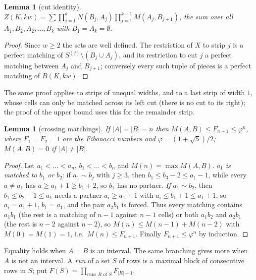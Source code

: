 \documentclass[11pt]{amsart}
\newtheorem{lemma}[theorem]{Lemma}
\theoremstyle{definition}
\theoremstyle{remark}
\begin{document}
\begin{lemma}[cut identity]\label{lem:cut}
$Z(K, kw) = \sum \prod_{j=1}^{k} N(B_j, A_j) \prod_{j=1}^{k-1} M(A_j, B_{j+1})$, the sum over all
$A_1, B_2, A_2, \dots, B_k$ with $B_1 = A_k = \emptyset$.
\end{lemma}
\begin{proof}
Since $w \ge 2$ the sets are well defined. The restriction of $X$ to strip $j$ is a perfect matching
of $S^{(j)} \setminus (B_j \cup A_j)$, and its restriction to cut $j$ a perfect matching between
$A_j$ and $B_{j+1}$; conversely every such tuple of pieces is a perfect matching of $B(K, kw)$.
\end{proof}

The same proof applies to strips of unequal widths, and to a last strip of width $1$, whose cells
can only be matched across its left cut (there is no cut to its right); the proof of the upper
bound uses this for the remainder strip.

\begin{lemma}[crossing matchings]\label{lem:fib}
If $|A| = |B| = n$ then $M(A, B) \le F_{n+1} \le \varphi^n$, where $F_1 = F_2 = 1$ are the
Fibonacci numbers and $\varphi = (1 + \sqrt 5)/2$; $M(A, B) = 0$ if $|A| \ne |B|$.
\end{lemma}
\begin{proof}
Let $a_1 < \dots < a_n$, $b_1 < \dots < b_n$ and $M(n) = \max M(A, B)$. \emph{$a_1$ is matched to
$b_1$ or $b_2$}: if $a_1 \sim b_j$ with $j \ge 3$, then $b_1 \le b_3 - 2 \le a_1 - 1$, while every
$a \ne a_1$ has $a \ge a_1 + 1 \ge b_1 + 2$, so $b_1$ has no partner. \emph{If $a_1 \sim b_2$},
then $b_1 \le b_2 - 1 \le a_1$ needs a partner $a_i \ge a_1 + 1$ with $a_i \le b_1 + 1 \le a_1 + 1$,
so $a_i = a_1 + 1$, $b_1 = a_1$, and the pair $a_2 b_1$ is forced. Thus every matching contains
$a_1 b_1$ (the rest is a matching of $n - 1$ against $n - 1$ cells) or both $a_1 b_2$ and
$a_2 b_1$ (the rest is $n-2$ against $n-2$), so $M(n) \le M(n-1) + M(n-2)$ with
$M(0) = M(1) = 1$, i.e.\ $M(n) \le F_{n+1}$. Finally $F_{n+1} \le \varphi^n$ by induction.
\end{proof}

Equality holds when $A = B$ is an interval. The same branching gives more when $A$ is not an
interval. A \emph{run} of a set $S$ of rows is a maximal block of consecutive rows in $S$; put
$F(S) = \prod_{\text{runs } R \text{ of } S} F_{|R|+1}$.
\end{document}
